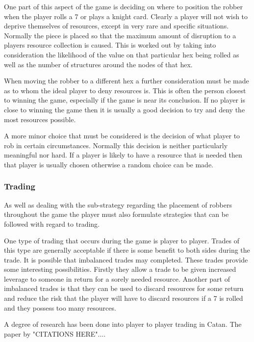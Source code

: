 \documentclass[]{article}
\begin{document}
\par One part of this aspect of the game is deciding on where to position the robber when the player rolls a 7 or plays a knight card. Clearly a player will not wish to deprive themselves of resources, except in very rare and specific situations. Normally the piece is placed so that the maximum amount of disruption to a players resource collection is caused. This is worked out by taking into consideration the likelihood of the value on that particular hex being rolled as well as the number of structures around the nodes of that hex.

\par When moving the robber to a different hex a further consideration must be made as to whom the ideal player to deny resources is. This is often the person closest to winning the game, especially if the game is near its conclusion. If no player is close to winning the game then it is usually a good decision to try and deny the most resources possible.

\par A more minor choice that must be considered is the decision of what player to rob in certain circumstances. Normally this decision is neither particularly meaningful nor hard. If a player is likely to have a resource that is needed then that player is usually chosen otherwise a random choice can be made.

\subsubsection{Trading}
As well as dealing with the sub-strategy regarding the placement of robbers throughout the game the player must also formulate strategies that can be followed with regard to trading.

\par One type of trading that occurs during the game is player to player. Trades of this type are generally acceptable if there is some benefit to both sides during the trade. It is possible that imbalanced trades may completed. These trades provide some interesting possibilities. Firstly they allow a trade to be given increased leverage to someone in return for a sorely needed resource. Another part of imbalanced trades is that they can be used to discard resources for some return and reduce the risk that the player will have to discard resources if a 7 is rolled and they possess too many resources.

\par A degree of research has been done into player to player trading in Catan. The paper by "CITATIONS HERE"....
\end{document}
